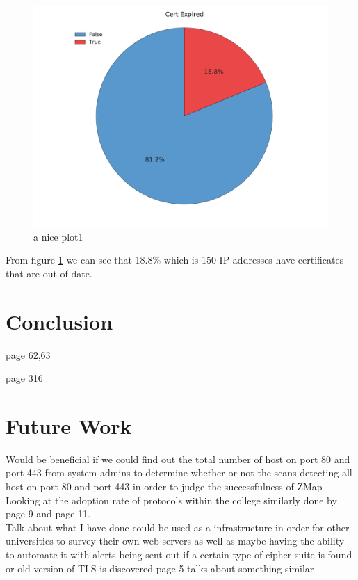 \documentclass[a4wide,leqno,12pt]{report}
\begin{document}
\begin{figure}[h!]
\includegraphics[scale=.5]{pdf_images/CertificateExpired}
\caption{a nice plot1}
\label{fig:certExpired}
\end{figure}

From figure \ref{fig:certExpired} we can see that 18.8\% which is 150 IP addresses have certificates that are out of date.



\chapter{Conclusion}
\cite{turner2014transport} page 62,63

\cite{mendes2008assessing} page 316
\chapter{Future Work}
Would be beneficial if we could find out the total number of host on port 80 and port 443 from system admins to determine whether or not the scans detecting all host on port 80 and port 443 in order to judge the successfulness of ZMap\\

Looking at the adoption rate of protocols within the college similarly done by \cite{durumeric2013zmap} page 9 and \cite{durumeric2013analysis} page 11.\\

Talk about what I have done could be used as a infrastructure in order for other universities to survey their own web servers as well as maybe having the ability to automate it with alerts being sent out if a certain type of cipher suite is found or old version of TLS is discovered\cite{durumeric2015search} page 5 talks about something similar\\
\end{document}

